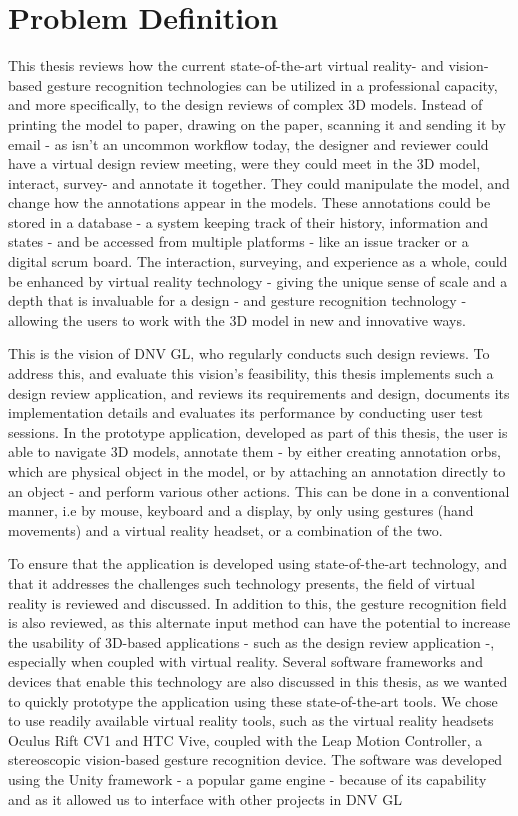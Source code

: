 \section{Problem Definition}
This thesis reviews how the current state-of-the-art virtual reality- and vision-based gesture recognition technologies can be utilized in a professional capacity, 
and more specifically, to the design reviews of complex 3D models. 
Instead of printing the model to paper, drawing on the paper, scanning it and sending it by email - as isn't an uncommon workflow today, 
the designer and reviewer could have a virtual design review meeting, were they could meet in the 3D model, interact, survey- and annotate it together. 
They could manipulate the model, and change how the annotations appear in the models.
These annotations could be stored in a database - a system keeping track of their history, information and states - and be accessed from multiple platforms - like 
an issue tracker or a digital scrum board. The interaction, surveying, and experience as a whole, could be enhanced by virtual reality technology -
giving the unique sense of scale and a depth that is invaluable for a design - 
and gesture recognition technology - allowing the users to work with the 3D model in new and innovative ways. 

This is the vision of DNV GL, who regularly conducts such design reviews. %
To address this, and evaluate this vision's feasibility, this thesis implements such a design review application, and 
reviews its requirements and design, documents its implementation details and evaluates its performance by conducting user test sessions.
In the prototype application, developed as part of this thesis, the user is able to navigate 3D models, annotate them - by either creating 
annotation orbs, which are physical object in the model, or by attaching an annotation directly to an object - and perform various other actions. 
This can be done in a conventional manner, i.e by mouse, keyboard and a display, by only using gestures (hand movements) and a virtual reality headset, or 
a combination of the two.

To ensure that the application is developed using state-of-the-art technology, and that it addresses the challenges such technology presents, 
the field of virtual reality is reviewed and discussed. In addition to this, the gesture recognition field is also reviewed, as this alternate 
input method can have the potential to increase the usability of 3D-based applications - such as the design review application -, especially when coupled with virtual reality.
Several software frameworks and devices that enable this technology are also discussed in this thesis, as we wanted to quickly prototype the 
application using these state-of-the-art tools.
We chose to use readily available virtual reality tools, such as the virtual reality headsets Oculus Rift CV1 and HTC Vive, coupled with
the Leap Motion Controller, a stereoscopic vision-based gesture recognition device. The software was developed using the Unity 
framework - a popular game engine - because of its capability and as it allowed us to interface with other projects in DNV GL


